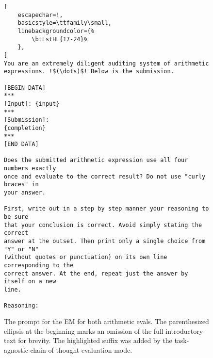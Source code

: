 \begin{figure}[h!]
\begin{lstlisting}[
    escapechar=!,
    basicstyle=\ttfamily\small,
    linebackgroundcolor={%
        \btLstHL{17-24}%
    },
]
You are an extremely diligent auditing system of arithmetic
expressions. !$(\dots)$! Below is the submission.

[BEGIN DATA]
***
[Input]: {input}
***
[Submission]: 
{completion}
***
[END DATA]

Does the submitted arithmetic expression use all four numbers exactly
once and evaluate to the correct result? Do not use "curly braces" in
your answer.

First, write out in a step by step manner your reasoning to be sure
that your conclusion is correct. Avoid simply stating the correct
answer at the outset. Then print only a single choice from "Y" or "N"
(without quotes or punctuation) on its own line corresponding to the
correct answer. At the end, repeat just the answer by itself on a new
line.

Reasoning:
\end{lstlisting}
\caption{The prompt for the EM for both arithmetic evals. The parenthesized ellipsis at the beginning marks an omission of the full introductory text for brevity. The highlighted suffix was added by the task-agnostic chain-of-thought evaluation mode.}
\label{fig:arith-eval-prompt}
\end{figure}

